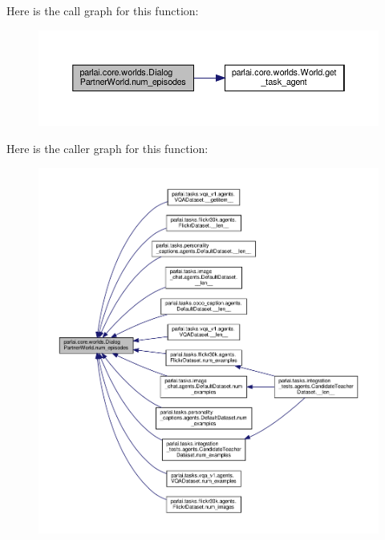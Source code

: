 Here is the call graph for this function\+:
\nopagebreak
\begin{figure}[H]
\begin{center}
\leavevmode
\includegraphics[width=350pt]{classparlai_1_1core_1_1worlds_1_1DialogPartnerWorld_ab34285faaee3830fbf1d9d53869ec47c_cgraph}
\end{center}
\end{figure}
Here is the caller graph for this function\+:
\nopagebreak
\begin{figure}[H]
\begin{center}
\leavevmode
\includegraphics[width=350pt]{classparlai_1_1core_1_1worlds_1_1DialogPartnerWorld_ab34285faaee3830fbf1d9d53869ec47c_icgraph}
\end{center}
\end{figure}
\mbox{\label{classparlai_1_1core_1_1worlds_1_1DialogPartnerWorld_aa925a37ec5968d137faf044279943e6a}} 
